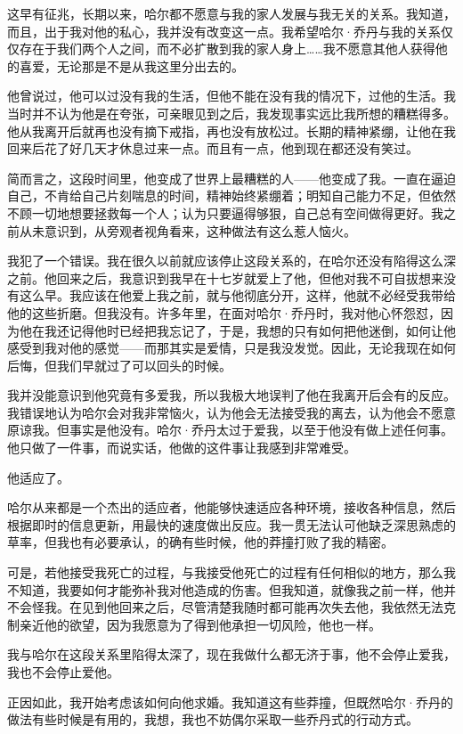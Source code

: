 \documentclass[../main]{subfiles}
\begin{document}
这早有征兆，长期以来，哈尔都不愿意与我的家人发展与我无关的关系。我知道，而且，出于我对他的私心，我并没有改变这一点。我希望哈尔·乔丹与我的关系仅仅存在于我们两个人之间，而不必扩散到我的家人身上……我不愿意其他人获得他的喜爱，无论那是不是从我这里分出去的。

他曾说过，他可以过没有我的生活，但他不能在没有我的情况下，过他的生活。我当时并不认为他是在夸张，可亲眼见到之后，我发现事实远比我所想的糟糕得多。他从我离开后就再也没有摘下戒指，再也没有放松过。长期的精神紧绷，让他在我回来后花了好几天才休息过来一点。而且有一点，他到现在都还没有笑过。

简而言之，这段时间里，他变成了世界上最糟糕的人——他变成了我。一直在逼迫自己，不肯给自己片刻喘息的时间，精神始终紧绷着；明知自己能力不足，但依然不顾一切地想要拯救每一个人；认为只要逼得够狠，自己总有空间做得更好。我之前从未意识到，从旁观者视角看来，这种做法有这么惹人恼火。

我犯了一个错误。我在很久以前就应该停止这段关系的，在哈尔还没有陷得这么深之前。他回来之后，我意识到我早在十七岁就爱上了他，但他对我不可自拔想来没有这么早。我应该在他爱上我之前，就与他彻底分开，这样，他就不必经受我带给他的这些折磨。但我没有。许多年里，在面对哈尔·乔丹时，我对他心怀怨怼，因为他在我还记得他时已经把我忘记了，于是，我想的只有如何把他迷倒，如何让他感受到我对他的感觉——而那其实是爱情，只是我没发觉。因此，无论我现在如何后悔，但我们早就过了可以回头的时候。

我并没能意识到他究竟有多爱我，所以我极大地误判了他在我离开后会有的反应。我错误地认为哈尔会对我非常恼火，认为他会无法接受我的离去，认为他会不愿意原谅我。但事实是他没有。哈尔·乔丹太过于爱我，以至于他没有做上述任何事。他只做了一件事，而说实话，他做的这件事让我感到非常难受。

他适应了。

哈尔从来都是一个杰出的适应者，他能够快速适应各种环境，接收各种信息，然后根据即时的信息更新，用最快的速度做出反应。我一贯无法认可他缺乏深思熟虑的草率，但我也有必要承认，的确有些时候，他的莽撞打败了我的精密。

可是，若他接受我死亡的过程，与我接受他死亡的过程有任何相似的地方，那么我不知道，我要如何才能弥补我对他造成的伤害。但我知道，就像我之前一样，他并不会怪我。在见到他回来之后，尽管清楚我随时都可能再次失去他，我依然无法克制亲近他的欲望，因为我愿意为了得到他承担一切风险，他也一样。

我与哈尔在这段关系里陷得太深了，现在我做什么都无济于事，他不会停止爱我，我也不会停止爱他。

正因如此，我开始考虑该如何向他求婚。我知道这有些莽撞，但既然哈尔·乔丹的做法有些时候是有用的，我想，我也不妨偶尔采取一些乔丹式的行动方式。
\end{document}
